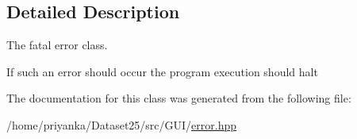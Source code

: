 \subsection{\-Detailed \-Description}
\-The fatal error class. 

\-If such an error should occur the program execution should halt 

\-The documentation for this class was generated from the following file\-:\begin{DoxyCompactItemize}
\item 
/home/priyanka/\-Dataset25/src/\-G\-U\-I/\hyperlink{error_8hpp}{error.\-hpp}\end{DoxyCompactItemize}
